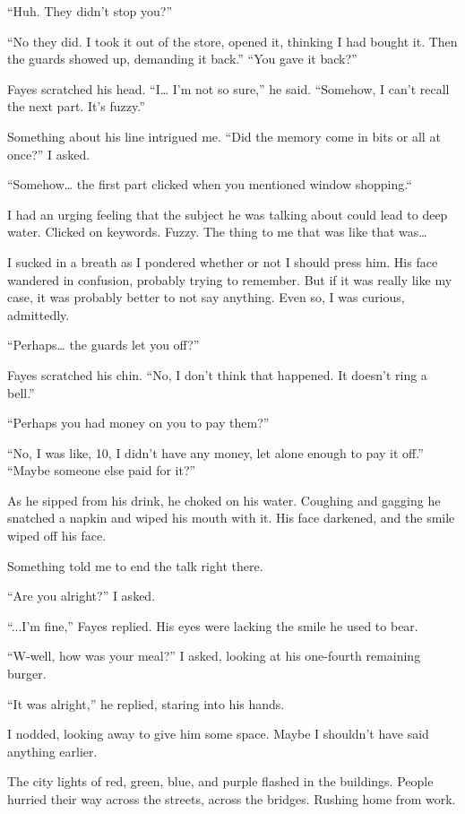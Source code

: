 “Huh. They didn’t stop you?”

“No they did. I took it out of the store, opened it, thinking I had bought it. Then the guards showed up, demanding it back.”
“You gave it back?”

Fayes scratched his head. “I… I’m not so sure,” he said. “Somehow, I can’t recall the next part. It’s fuzzy.”

Something about his line intrigued me. “Did the memory come in bits or all at once?” I asked.

“Somehow… the first part clicked when you mentioned window shopping.“

I had an urging feeling that the subject he was talking about could lead to deep water. Clicked on keywords. Fuzzy. The thing to me that was like that was…

I sucked in a breath as I pondered whether or not I should press him. His face wandered in confusion, probably trying to remember. But if it was really like my case, it was probably better to not say anything. Even so, I was curious, admittedly.

“Perhaps… the guards let you off?”

Fayes scratched his chin. “No, I don’t think that happened. It doesn’t ring a bell.”

“Perhaps you had money on you to pay them?”

“No, I was like, 10, I didn’t have any money, let alone enough to pay it off.”
“Maybe someone else paid for it?”

As he sipped from his drink, he choked on his water. Coughing and gagging he snatched a napkin and wiped his mouth with it. His face darkened, and the smile wiped off his face.

Something told me to end the talk right there.

“Are you alright?” I asked.

“...I’m fine,” Fayes replied. His eyes were lacking the smile he used to bear. 

“W-well, how was your meal?” I asked, looking at his one-fourth remaining burger.

“It was alright,” he replied, staring into his hands.

I nodded, looking away to give him some space. Maybe I shouldn’t have said anything earlier.

The city lights of red, green, blue, and purple flashed in the buildings. People hurried their way across the streets, across the bridges. Rushing home from work. 

